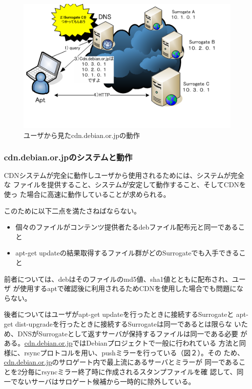 \documentclass[mingoth,a4paper]{jsarticle}
\begin{document}
\begin{figure}[H]
\includegraphics[width=\hsize]{image200708/surrogate.png}

 \caption{ユーザから見たcdn.debian.or.jpの動作}
 \label{fig:usercdndebianorjp}
\end{figure}

\subsubsection{cdn.debian.or.jpのシステムと動作}
CDNシステムが完全に動作しユーザから使用されるためには、システムが完全な
ファイルを提供すること、システムが安定して動作すること、そしてCDNを使っ
た場合に高速に動作していることが求められる。


このために以下二点を満たさねばならない。
\begin{itemize}
 \item  個々のファイルがコンテンツ提供者たるdebファイル配布元と同一であること
 \item  apt-get updateの結果取得するファイル群がどのSurrogateでも入手できること
\end{itemize}
前者については、debはそのファイルのmd5値、sha1値とともに配布され、ユーザ
が使用するaptで確認後に利用されるためCDNを使用した場合でも問題にならない。

後者についてはユーザがapt-get updateを行ったときに接続するSurrogateと
apt-get dist-upgradeを行ったときに接続するSurrogateは同一であるとは限らな
いため、DNSがSurrogateとして返すサーバが保持するファイルは同一である必要
がある。\url{cdn.debian.or.jp}ではDebianプロジェクトで一般に行われている
方法と同様に、rsyncプロトコルを用い、pushミラーを行っている（図２）。その
ため、\url{cdn.debian.or.jp}のサロゲート内で最上流にあるサーバとミラーが
同一であることを2分毎にrsyncミラー終了時に作成されるスタンプファイルを確
認して、同一でないサーバはサロゲート候補から一時的に除外している。
\end{document}

